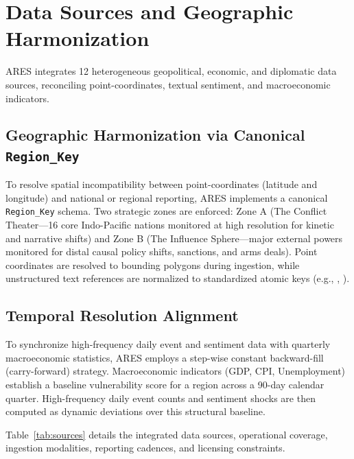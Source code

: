 \documentclass[preprint,12pt]{elsarticle}
\begin{document}
\section{Data Sources and Geographic Harmonization}
\label{sec:data}

ARES integrates 12 heterogeneous geopolitical, economic, and diplomatic data sources, reconciling point-coordinates, textual sentiment, and macroeconomic indicators.

\subsection{Geographic Harmonization via Canonical \texttt{Region\_Key}}
To resolve spatial incompatibility between point-coordinates (latitude and longitude) and national or regional reporting, ARES implements a canonical \texttt{Region\_Key} schema. Two strategic zones are enforced: Zone A (The Conflict Theater---16 core Indo-Pacific nations monitored at high resolution for kinetic and narrative shifts) and Zone B (The Influence Sphere---major external powers monitored for distal causal policy shifts, sanctions, and arms deals). Point coordinates are resolved to bounding polygons during ingestion, while unstructured text references are normalized to standardized atomic keys (e.g., , ).

\subsection{Temporal Resolution Alignment}
To synchronize high-frequency daily event and sentiment data with quarterly macroeconomic statistics, ARES employs a step-wise constant backward-fill (carry-forward) strategy. Macroeconomic indicators (GDP, CPI, Unemployment) establish a baseline vulnerability score for a region across a 90-day calendar quarter. High-frequency daily event counts and sentiment shocks are then computed as dynamic deviations over this structural baseline.

Table~\ref{tab:sources} details the integrated data sources, operational coverage, ingestion modalities, reporting cadences, and licensing constraints.
\end{document}

